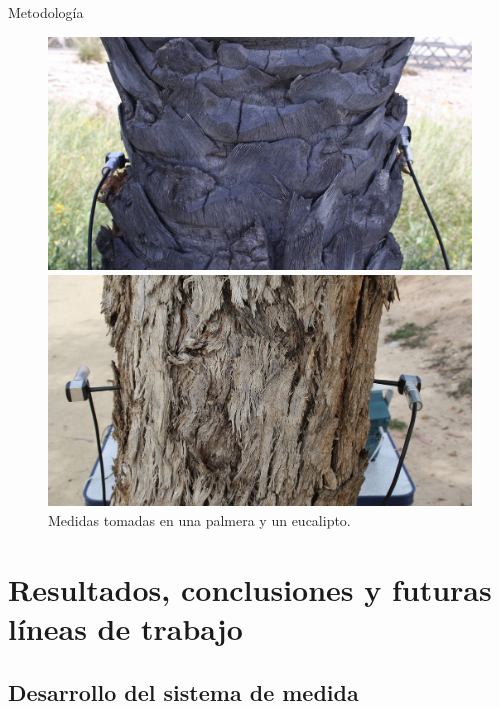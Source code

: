 \documentclass[utf8, compress]			{beamer}
\begin{document}
\begin{frame}{Metodología}
    \begin{figure}
	\begin{minipage}[top][\heighteuca][c]{\widthpalm}
	    \includegraphics{mpalmera.jpg}
	\end{minipage}
	\hspace{.1em}
	\begin{minipage}[top][\heighteuca][c]{\widtheuca}
	    \includegraphics{meucalipto.jpg}
	\end{minipage}
	\caption{Medidas tomadas en una palmera y un eucalipto.}
	\label{fig:measures}
    \end{figure}
\end{frame}


\section[Resultados y conclusiones]{Resultados, conclusiones y futuras
    líneas de trabajo}

\subsection{Desarrollo del sistema de medida}
\end{document}
